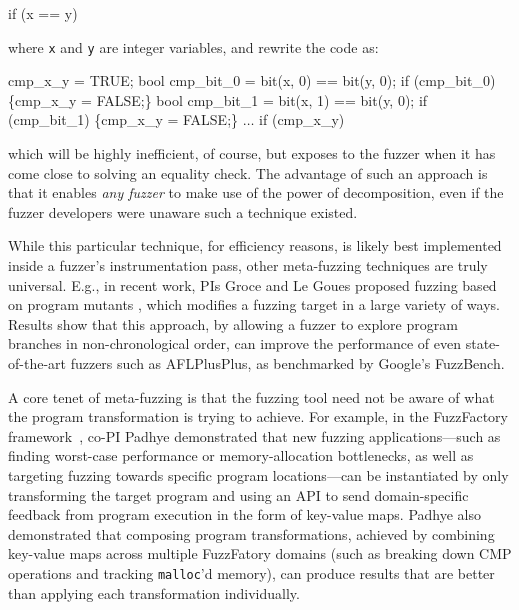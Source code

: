 \begin{code}

if (x == y)
\end{code}

\noindent where {\tt x} and {\tt y} are integer variables, and rewrite the code 
as:

\begin{code}
cmp\_x\_y = TRUE;
bool cmp\_bit\_0 = bit(x, 0) == bit(y, 0);
if (cmp\_bit\_0) \{cmp\_x\_y = FALSE;\}
bool cmp\_bit\_1 = bit(x, 1) == bit(y, 0);
if (cmp\_bit\_1) \{cmp\_x\_y = FALSE;\}
$\ldots$
if (cmp\_x\_y)
\end{code}

\noindent which will be highly inefficient, of course, but exposes to the 
fuzzer when it has come close to solving an equality check.  The advantage of such 
an approach is that it enables \emph{any fuzzer} to make use of the power of 
decomposition, even if the fuzzer developers were unaware such a technique 
existed. 

While this particular technique, for efficiency reasons, is likely best 
implemented inside a fuzzer's instrumentation pass, other meta-fuzzing 
techniques are truly universal.  E.g., in recent work, PIs Groce and Le Goues 
proposed fuzzing based on program mutants \cite{}, which modifies a fuzzing 
target in a large variety of ways.  Results show that this approach, by 
allowing a fuzzer to explore program branches in non-chronological order, can 
improve the performance of even state-of-the-art fuzzers such as AFLPlusPlus, 
as benchmarked by Google's FuzzBench.

A core tenet of meta-fuzzing is that the fuzzing tool need not be aware of what 
the program transformation is trying to achieve. For example, in the 
FuzzFactory framework~\cite{fuzzfactory}, co-PI Padhye demonstrated that new 
fuzzing applications---such as finding worst-case performance or 
memory-allocation bottlenecks, as well as targeting fuzzing towards specific 
program locations---can be instantiated by only transforming the target program 
and using an API to send domain-specific feedback from program execution in the 
form of key-value maps. Padhye also demonstrated that composing program 
transformations, achieved by combining key-value maps across multiple 
FuzzFatory domains (such as breaking down CMP operations and tracking 
\texttt{malloc}'d memory), can produce results that are better than applying 
each transformation individually.

